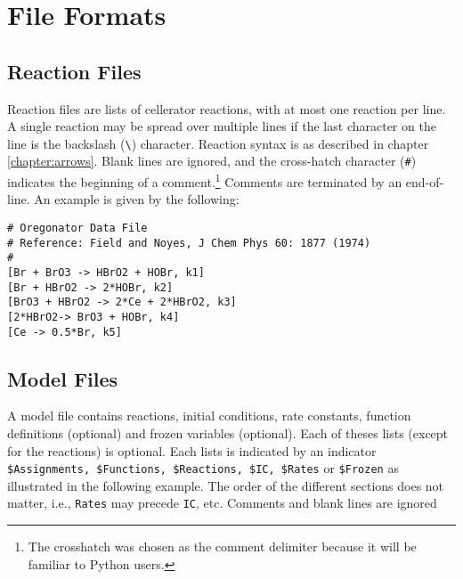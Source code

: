 \chapter{File Formats}

\section{Reaction Files}

Reaction files are lists of cellerator reactions, with at most one reaction per line. A single reaction may be spread over multiple lines if the last character on the line is the backslash (\verb|\|) character.  Reaction syntax is as described in chapter \ref{chapter:arrows}. Blank lines are ignored, and the cross-hatch character (\verb.#.) indicates the beginning of a comment.\footnote{The crosshatch was chosen as the comment delimiter because it will be familiar to Python users.} Comments are terminated by an end-of-line. An example is given by the following:


\begin{Verbatim}[frame=single]
# Oregonator Data File
# Reference: Field and Noyes, J Chem Phys 60: 1877 (1974)
#
[Br + BrO3 -> HBrO2 + HOBr, k1] 
[Br + HBrO2 -> 2*HOBr, k2]
[BrO3 + HBrO2 -> 2*Ce + 2*HBrO2, k3] 
[2*HBrO2-> BrO3 + HOBr, k4] 
[Ce -> 0.5*Br, k5]
\end{Verbatim}
\newpage
\section{Model Files}

A model file contains reactions, initial conditions, rate constants, function definitions (optional) and frozen variables (optional). Each of theses lists (except for the reactions) is optional. Each lists is indicated by an indicator {\tt \$Assignments, \$Functions, \$Reactions, \$IC, \$Rates} or {\tt \$Frozen} as illustrated in the following example. The order of the different sections does not matter, i.e., {\tt Rates} may precede {\tt IC}, etc. Comments and blank lines are ignored

